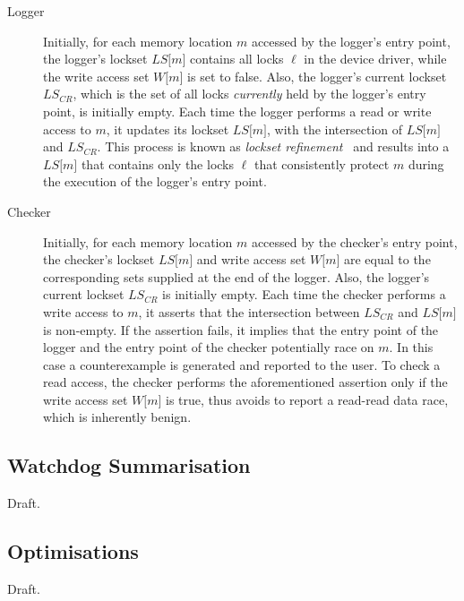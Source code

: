 \begin{description}
  \item[Logger] Initially, for each memory location $m$ accessed by the logger's entry point, the logger's lockset $\mathit{LS}\lbrack m\rbrack$ contains all locks $\ell$ in the device driver, while the write access set $W\lbrack m\rbrack$ is set to false. Also, the logger's current lockset $\mathit{LS}_{CR}$, which is the set of all locks \emph{currently} held by the logger's entry point, is initially empty. Each time the logger performs a read or write access to $m$, it updates its lockset $\mathit{LS}\lbrack m\rbrack$, with the intersection of $\mathit{LS}\lbrack m\rbrack$ and $\mathit{LS}_{CR}$. This process is known as \emph{lockset refinement}~\cite{savage1997eraser} and results into a $\mathit{LS}\lbrack m\rbrack$ that contains only the locks $\ell$ that consistently protect $m$ during the execution of the logger's entry point.
  
  \item[Checker] Initially, for each memory location $m$ accessed by the checker's entry point, the checker's lockset $\mathit{LS}\lbrack m\rbrack$ and write access set $W\lbrack m\rbrack$ are equal to the corresponding sets supplied at the end of the logger. Also, the logger's current lockset $\mathit{LS}_{CR}$ is initially empty. Each time the checker performs a write access to $m$, it asserts that the intersection between $\mathit{LS}_{CR}$ and $\mathit{LS}\lbrack m\rbrack$ is non-empty. If the assertion fails, it implies that the entry point of the logger and the entry point of the checker potentially race on $m$. In this case a counterexample is generated and reported to the user. To check a read access, the checker performs the aforementioned assertion only if the write access set $W\lbrack m\rbrack$ is true, thus avoids to report a read-read data race, which is inherently benign.
\end{description}

\subsection{Watchdog Summarisation}
\label{summarisation}

Draft.

\subsection{Optimisations}
\label{optimisations}

Draft.